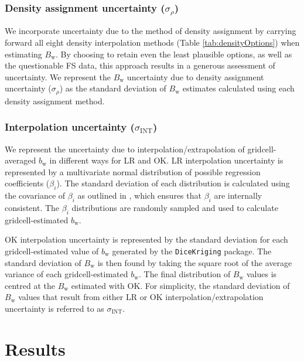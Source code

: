 \documentclass[twocolumn, letterpaper]{igs}
\begin{document}
	\subsubsection{Density assignment uncertainty ($\sigma_{\rho}$)}
We incorporate uncertainty due to the method of density assignment by carrying forward all eight density interpolation methods (Table \ref{tab:densityOptions}) when estimating $B_\mathrm{w}$. By choosing to retain even the least plausible options, as well as the questionable FS data, this approach results in a generous assessment of uncertainty. We represent the $B_\mathrm{w}$ uncertainty due to density assignment uncertainty ($\sigma_{\rho}$) as the standard deviation of $B_\mathrm{w}$ estimates calculated using each density assignment method.

	\subsubsection{Interpolation uncertainty ($\sigma_{\mathrm{INT}}$)}
We represent the uncertainty due to interpolation/extrapolation of gridcell-averaged $b_\mathrm{w}$ in different ways for LR and OK. LR interpolation uncertainty is represented by a multivariate normal distribution of possible regression coefficients ($\beta_i$). The standard deviation of each distribution is calculated using the covariance of $\beta_i$ as outlined in \cite{Bagos2015}, which ensures that $\beta_i$ are internally consistent. The $\beta_i$ distributions are randomly sampled and used to calculate gridcell-estimated $b_\mathrm{w}$.

OK interpolation uncertainty is represented by the standard deviation for each gridcell-estimated value of $b_\mathrm{w}$ generated by the \texttt{DiceKriging} package. The standard deviation of $B_\mathrm{w}$ is then found by taking the square root of the average variance of each gridcell-estimated $b_\mathrm{w}$. The final distribution of $B_\mathrm{w}$ values is centred at the $B_\mathrm{w}$ estimated with OK. For simplicity, the standard deviation of $B_\mathrm{w}$ values that result from either LR or OK interpolation/extrapolation uncertainty is referred to as $\sigma_{\mathrm{INT}}$.



\section{Results}
\end{document}
